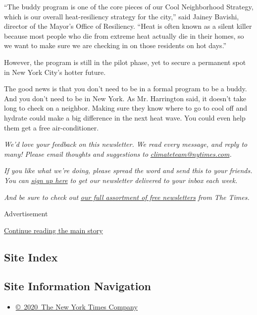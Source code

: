 ``The buddy program is one of the core pieces of our Cool Neighborhood
Strategy, which is our overall heat-resiliency strategy for the city,''
said Jainey Bavishi, director of the Mayor's Office of Resiliency.
``Heat is often known as a silent killer because most people who die
from extreme heat actually die in their homes, so we want to make sure
we are checking in on those residents on hot days.''

However, the program is still in the pilot phase, yet to secure a
permanent spot in New York City's hotter future.

The good news is that you don't need to be in a formal program to be a
buddy. And you don't need to be in New York. As Mr. Harrington said, it
doesn't take long to check on a neighbor. Making sure they know where to
go to cool off and hydrate could make a big difference in the next heat
wave. You could even help them get a free air-conditioner.

\emph{We'd love your feedback on this newsletter. We read every message,
and reply to many! Please email thoughts and suggestions to}
\href{mailto:climateteam@nytimes.com?subject=Newsletter\%20Feedback}{\emph{climateteam@nytimes.com}}\emph{.}

\emph{If you like what we're doing, please spread the word and send this
to your friends. You can}
\href{https://www.nytimes.com/newsletters/climate-change}{\emph{sign up
here}} \emph{to get our newsletter delivered to your inbox each week.}

\emph{And be sure to check out}
\href{https://www.nytimes.com/newsletters}{\emph{our full assortment of
free newsletters}} \emph{from The Times.}

Advertisement

\protect\hyperlink{after-bottom}{Continue reading the main story}

\hypertarget{site-index}{%
\subsection{Site Index}\label{site-index}}

\hypertarget{site-information-navigation}{%
\subsection{Site Information
Navigation}\label{site-information-navigation}}

\begin{itemize}
\tightlist
\item
  \href{https://help.nytimes.com/hc/en-us/articles/115014792127-Copyright-notice}{©~2020~The
  New York Times Company}
\end{itemize}

